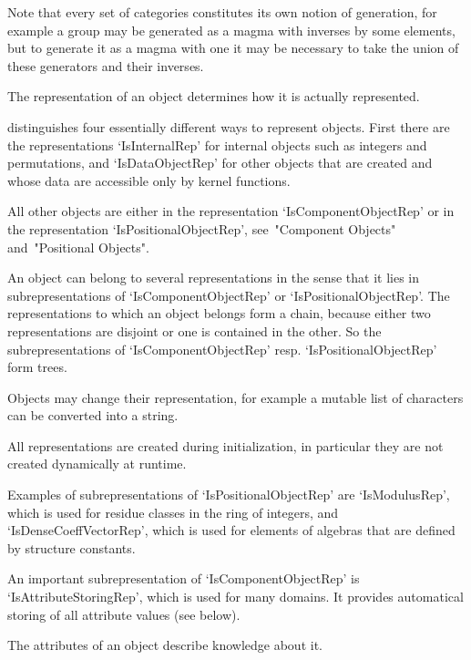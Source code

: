 Note that every set of categories constitutes its own notion of
generation, for example a group may be generated as a magma with inverses
by some elements,
but to generate it as a magma with one it may be necessary to take the
union of these generators and their inverses.


The representation of an object determines how it is actually
represented.

{\GAP} distinguishes four essentially different ways to represent
objects.
First there are the representations `IsInternalRep' for internal objects
such as integers and permutations,
and `IsDataObjectRep' for other objects that are created and whose data
are accessible only by kernel functions.


All other objects are either in the representation `IsComponentObjectRep'
or in the representation `IsPositionalObjectRep',
see~"Component Objects" and~"Positional Objects".

An object can belong to several representations in the sense that it lies
in subrepresentations of `IsComponentObjectRep' or
`IsPositionalObjectRep'.
The representations to which an object belongs form a chain, 
because either two representations are disjoint or one is contained in
the other.
So the subrepresentations of `IsComponentObjectRep' resp.
`IsPositionalObjectRep' form trees.

Objects may change their representation,
for example a mutable list of characters can be converted into a string.

All representations are created during initialization,
in particular they are not created dynamically at runtime.

Examples of subrepresentations of `IsPositionalObjectRep' are
`IsModulusRep',
which is used for residue classes in the ring of integers,
and `IsDenseCoeffVectorRep',
which is used for elements of algebras that are defined by structure
constants.

An important subrepresentation of `IsComponentObjectRep' is
`IsAttributeStoringRep', which is used for many domains.
It provides automatical storing of all attribute values (see below).


The attributes of an object describe knowledge about it.

